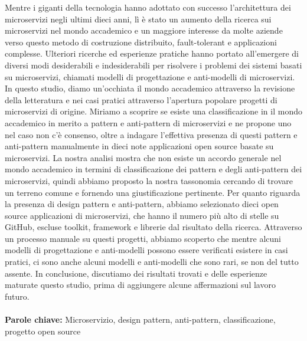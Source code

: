 \documentclass{Configuration_Files/PoliMi3i_thesis}
\begin{document}
Mentre i giganti della tecnologia hanno adottato con successo l'architettura dei microservizi negli ultimi dieci anni, lì
è stato un aumento della ricerca sui microservizi nel mondo accademico e un maggiore interesse
da molte aziende verso questo metodo di costruzione distribuito, fault-tolerant e
applicazioni complesse. Ulteriori ricerche ed esperienze pratiche hanno portato all'emergere di
diversi modi desiderabili e indesiderabili per risolvere i problemi dei sistemi basati su microservizi,
chiamati modelli di progettazione e anti-modelli di microservizi. In questo studio, diamo un'occhiata
il mondo accademico attraverso la revisione della letteratura e nei casi pratici attraverso l'apertura popolare
progetti di microservizi di origine. Miriamo a scoprire se esiste una classificazione in
il mondo accademico in merito a pattern e anti-pattern di microservizi e ne propone uno nel caso
non c'è consenso, oltre a indagare l'effettiva presenza di questi pattern e
anti-pattern manualmente in dieci note applicazioni open source basate su microservizi.
La nostra analisi mostra che non esiste un accordo generale nel mondo accademico in
termini di classificazione dei pattern e degli anti-pattern dei microservizi, quindi abbiamo proposto
la nostra tassonomia cercando di trovare un terreno comune e fornendo una giustificazione pertinente.
Per quanto riguarda la presenza di design pattern e anti-pattern, abbiamo selezionato dieci open source
applicazioni di microservizi, che hanno il numero più alto di stelle su GitHub, escluse
toolkit, framework e librerie dal risultato della ricerca. Attraverso un processo manuale su
questi progetti, abbiamo scoperto che mentre alcuni modelli di progettazione e anti-modelli possono essere verificati
esistere in casi pratici, ci sono anche alcuni modelli e anti-modelli che sono rari,
se non del tutto assente. In conclusione, discutiamo dei risultati trovati e delle esperienze maturate
questo studio, prima di aggiungere alcune affermazioni sul lavoro futuro.
\\
\\
\textbf{Parole chiave:} Microservizio, design pattern, anti-pattern, classificazione, progetto open source %


\thispagestyle{empty}
\tableofcontents %
\thispagestyle{empty}
\cleardoublepage
\end{document}
